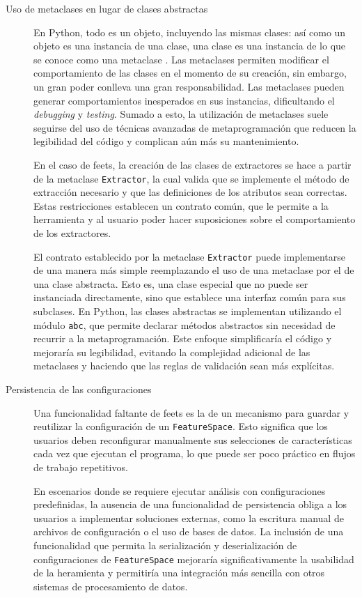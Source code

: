 \begin{description}
    \item[Uso de metaclases en lugar de clases abstractas]
    En Python, todo es un objeto, incluyendo las mismas clases: así como un objeto es una instancia de una clase, una clase es una instancia de lo que se conoce como una metaclase \citep{python2025python}. Las metaclases permiten modificar el comportamiento de las clases en el momento de su creación, sin embargo, un gran poder conlleva una gran responsabilidad. Las metaclases pueden generar comportamientos inesperados en sus instancias, dificultando el \emph{debugging} y \emph{testing}. Sumado a esto, la utilización de metaclases suele seguirse del uso de técnicas avanzadas de metaprogramación que reducen la legibilidad del código y complican aún más su mantenimiento.

    En el caso de \gls{feets}, la creación de las clases de extractores se hace a partir de la metaclase \texttt{Extractor}, la cual valida que se implemente el método de extracción necesario y que las definiciones de los atributos sean correctas. Estas restricciones establecen un contrato común, que le permite a la herramienta y al usuario poder hacer suposiciones sobre el comportamiento de los extractores.

    El contrato establecido por la metaclase \texttt{Extractor} puede implementarse de una manera más simple reemplazando el uso de una metaclase por el de una clase abstracta. Esto es, una clase especial que no puede ser instanciada directamente, sino que establece una interfaz común para sus subclases. En Python, las clases abstractas se implementan utilizando el módulo \texttt{abc}, que permite declarar métodos abstractos sin necesidad de recurrir a la metaprogramación. Este enfoque simplificaría el código y mejoraría su legibilidad, evitando la complejidad adicional de las metaclases y haciendo que las reglas de validación sean más explícitas.

    \item[Persistencia de las configuraciones]
    Una funcionalidad faltante de \gls{feets} es la de un mecanismo para guardar y reutilizar la configuración de un \texttt{Fea\-ture\-Space}. Esto significa que los usuarios deben reconfigurar manualmente sus selecciones de características cada vez que ejecutan el programa, lo que puede ser poco práctico en flujos de trabajo repetitivos. 
    
    En escenarios donde se requiere ejecutar análisis con configuraciones predefinidas, la ausencia de una funcionalidad de persistencia obliga a los usuarios a implementar soluciones externas, como la escritura manual de archivos de configuración o el uso de bases de datos. La inclusión de una funcionalidad que permita la serialización y deserialización de configuraciones de \texttt{FeatureSpace} mejoraría significativamente la usabilidad de la heramienta y permitiría una integración más sencilla con otros sistemas de procesamiento de datos.


\end{description}
